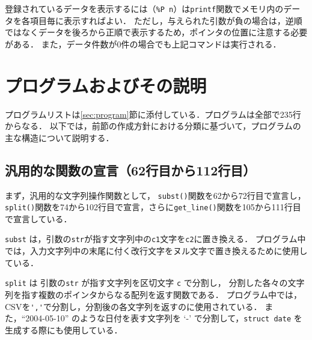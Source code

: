 \documentclass[a4j,11pt]{jarticle}
\begin{document}
登録されているデータを表示するには（\verb|%P n|）は\verb|printf|関数でメモリ内のデータを各項目毎に表示すればよい．
ただし，与えられた引数が負の場合は，逆順ではなくデータを後ろから正順で表示するため，ポインタの位置に注意する必要がある．
また，データ件数が0件の場合でも上記コマンドは実行される．


\section{プログラムおよびその説明}\label{sec:explain}



プログラムリストは\ref{sec:program}節に添付している．プログラムは全部で235行からなる．
以下では，前節の作成方針における分類に基づいて，プログラムの主な構造について説明する．

\subsection{汎用的な関数の宣言（62行目から112行目）}

まず，汎用的な文字列操作関数として，
\verb|subst()|関数を62から72行目で宣言し，\verb|split()|関数を74から102行目で宣言，さらに\verb|get_line()|関数を105から111行目で宣言している．

\verb|subst| は，引数の\verb|str|が指す文字列中の\verb|c1|文字を\verb|c2|に置き換える．
プログラム中では，入力文字列中の末尾に付く改行文字をヌル文字で置き換えるために使用している．

\verb|split| は 引数の\verb|str| が指す文字列を区切文字 \verb|c| で分割し，
分割した各々の文字列を指す複数のポインタからなる配列を返す関数である．
プログラム中では，CSVを\verb|','|で分割し，分割後の各文字列を返すのに使用されている．
また，``2004-05-10'' のような日付を表す文字列を `-' で分割して，\verb|struct date| を生成する際にも使用している．
\end{document}
